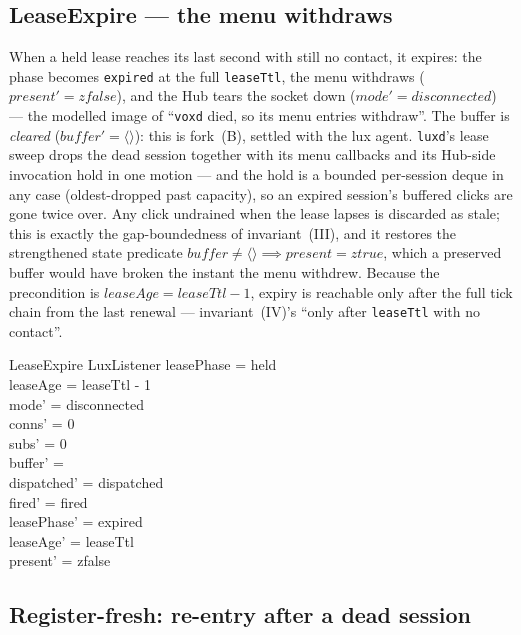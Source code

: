 \documentclass[a4paper,10pt,fleqn]{article}
\begin{document}
\subsection{LeaseExpire --- the menu withdraws}

When a held lease reaches its last second with still no contact, it expires: the
phase becomes \texttt{expired} at the full \texttt{leaseTtl}, the menu withdraws
($present' = zfalse$), and the Hub tears the socket down
($mode' = disconnected$) --- the modelled image of ``\texttt{voxd} died, so its
menu entries withdraw''. The buffer is \emph{cleared}
($buffer' = \langle \rangle$): this is fork~(B), settled with the lux agent.
\texttt{luxd}'s lease sweep drops the dead session together with its menu
callbacks and its Hub-side invocation hold in one motion --- and the hold is a
bounded per-session deque in any case (oldest-dropped past capacity), so an
expired session's buffered clicks are gone twice over. Any click undrained when
the lease lapses is discarded as stale; this is exactly the gap-boundedness of
invariant~(III), and it restores the strengthened state predicate
$buffer \neq \langle \rangle \implies present = ztrue$, which a preserved buffer
would have broken the instant the menu withdrew. Because the precondition is
$leaseAge = leaseTtl - 1$, expiry is reachable only after the full tick chain
from the last renewal --- invariant~(IV)'s ``only after \texttt{leaseTtl} with no
contact''.

\begin{schema}{LeaseExpire}
  \Delta LuxListener
  \where
  leasePhase = held \\
  leaseAge = leaseTtl - 1 \\
  mode' = disconnected \\
  conns' = 0 \\
  subs' = 0 \\
  buffer' = \langle \rangle \\
  dispatched' = dispatched \\
  fired' = fired \\
  leasePhase' = expired \\
  leaseAge' = leaseTtl \\
  present' = zfalse
\end{schema}

\subsection{Register-fresh: re-entry after a dead session}
\label{sec:regfresh}
\end{document}
